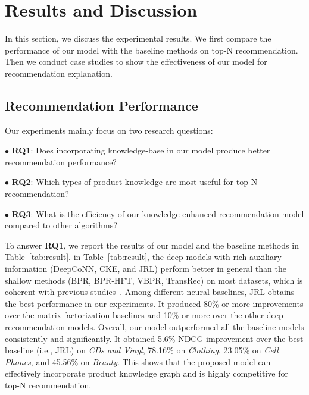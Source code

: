 \documentclass[algorithms,article,accept,moreauthors,pdftex,10pt,a4paper]{Definitions/mdpi}
\begin{document}
\fi



\section{Results and Discussion}\label{sec:results}

In this section, we discuss the experimental results. 
We first compare the performance of our model with the baseline methods on top-N recommendation.
Then we conduct case studies to show the effectiveness of our model for recommendation explanation. 

\subsection{Recommendation Performance}



\noindent
Our experiments mainly focus on two research questions:

\vspace{6 pt} 

\hspace{-1cm}$\bullet$ \textbf{RQ1}: Does incorporating knowledge-base in our model produce better recommendation performance?

\hspace{-1cm}$\bullet$ \textbf{RQ2}: Which types of product knowledge are most useful for top-N recommendation? 

\hspace{-1cm}$\bullet$ \textbf{RQ3}: What is the efficiency of our knowledge-enhanced recommendation model compared to other algorithms?





\vspace{6 pt} To answer \textbf{RQ1}, we report the results of our model and the baseline methods in Table~\ref{tab:result}.
 in Table~\ref{tab:result}, the deep models with rich auxiliary information (DeepCoNN, CKE, and JRL) perform better in general than the shallow methods (BPR, BPR-HFT, VBPR, TransRec) on most datasets, which is coherent with previous studies~\cite{zhang2016collaborativekdd,zheng2017joint,zhang2017joint}.
Among different neural baselines, JRL obtains the best performance in our experiments.
It produced 80\% or more improvements over the matrix factorization baselines and 10\% or more over the other deep recommendation models.
Overall, our model outperformed all the baseline models consistently and significantly. 
It obtained 5.6\% NDCG improvement over the best baseline (i.e., JRL) on \textit{CDs and Vinyl}, 78.16\% on \textit{Clothing}, 23.05\% on \textit{Cell Phones}, and 45.56\% on \textit{Beauty}.
This shows that the proposed model can effectively incorporate product knowledge graph and is highly competitive for top-N recommendation. 
\end{document}
